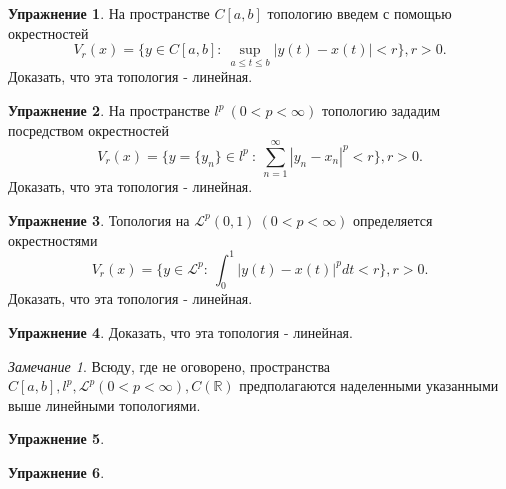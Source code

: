 \documentclass[a4paper, 12pt]{article}
\theoremstyle{definition}
\newtheorem{problem}{Упражнение}[section]
\theoremstyle{remark}
\newtheorem*{remark}{Замечание}
\begin{document}
\begin{problem}
    На пространстве $C[a, b]$ топологию введем с помощью окрестностей
    \[V_r(x) = \{y\in C[a, b] : \ \sup_{a \le t \le b} |y(t) - x(t)| < r\}, r > 0.\]
    Доказать, что эта топология - линейная.
\end{problem}
\begin{problem}
    На пространстве $l^p \ (0 < p < \infty)$ топологию зададим посредством окрестностей
    \[V_r(x) = \{y = \{y_n\}\in l^p \ : \ \sum_{n=1}^{\infty}|y_n-x_n|^p< r\}, r>0.\]
    Доказать, что эта топология - линейная.
\end{problem}
\begin{problem}
    Топология на $\mathscr{L}^p (0, 1) \ (0 < p < \infty)$ определяется окрестностями
    \[V_r(x) = \{y\in \mathscr{L}^p : \ \int_0^1 |y(t) - x(t)|^p dt < r\}, r > 0.\]
    Доказать, что эта топология - линейная.
\end{problem}
\begin{problem}
    Доказать, что эта топология - линейная.
\end{problem}
\begin{remark}
    Всюду, где не оговорено, пространства $C[a, b], l^p, \mathscr{L}^p (0 < p < \infty), C(\mathbb{R})$
    предполагаются наделенными указанными выше линейными топологиями.
\end{remark}
\begin{problem}
    
\end{problem}
\begin{problem}
    
\end{problem}
\end{document}
